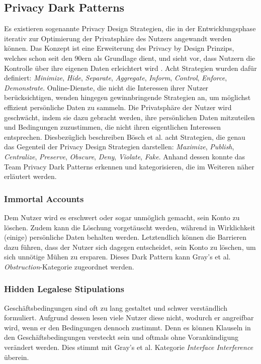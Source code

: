 \documentclass[a4paper]{article}
\begin{document}
\subsection{Privacy Dark Patterns}
\label{sub:privacy_dark_patterns}
Es existieren sogenannte Privacy Design Strategien, die in der Entwicklungsphase iterativ zur Optimierung der Privatsphäre des Nutzers angewandt werden können. Das Konzept ist eine Erweiterung des Privacy by Design Prinzips, welches schon seit den 90ern als Grundlage dient, und sieht vor, dass Nutzern die Kontrolle über ihre eigenen Daten erleichtert wird \cite{boesch}. Acht Strategien wurden dafür definiert: \textit{Minimize}, \textit{Hide}, \textit{Separate}, \textit{Aggregate}, \textit{Inform}, \textit{Control}, \textit{Enforce}, \textit{Demonstrate}.\newline
Online-Dienste, die nicht die Interessen ihrer Nutzer berücksichtigen, wenden hingegen gewinnbringende Strategien an, um möglichst effizient persönliche Daten zu sammeln. Die Privatsphäre der Nutzer wird geschwächt, indem sie dazu gebracht werden, ihre persönlichen Daten mitzuteilen und Bedingungen zuzustimmen, die nicht ihren eigentlichen Interessen entsprechen. Diesbezüglich beschreiben Bösch et al. acht Strategien, die genau das Gegenteil der Privacy Design Strategien darstellen: 
\textit{Maximize}, \textit{Publish}, \textit{Centralize}, \textit{Preserve}, \textit{Obscure}, \textit{Deny}, \textit{Violate}, \textit{Fake}. Anhand dessen konnte das Team Privacy Dark Patterns erkennen und kategorisieren, die im Weiteren näher erläutert werden.

\subsubsection{Immortal Accounts}
\label{sssec:immortal_accounts}
Dem Nutzer wird es erschwert oder sogar unmöglich gemacht, sein Konto zu löschen. Zudem kann die Löschung vorgetäuscht werden, während in Wirklichkeit (einige) persönliche Daten behalten werden. Letztendlich können die Barrieren dazu führen, dass der Nutzer sich dagegen entscheidet, sein Konto zu löschen, um sich unnötige Mühen zu ersparen.\newline
Dieses Dark Pattern kann Gray's et al. \textit{Obstruction}-Kategorie zugeordnet werden.

\subsubsection{Hidden Legalese Stipulations}
\label{sssec:hidden_legalese_stipulations}
Geschäftsbedingungen sind oft zu lang gestaltet und schwer verständlich formuliert. Aufgrund dessen lesen viele Nutzer diese nicht, wodurch er angreifbar wird, wenn er den Bedingungen dennoch zustimmt. Denn es können Klauseln in den Geschäftsbedingungen versteckt sein und oftmals ohne Vorankündigung verändert werden.\newline
Dies stimmt mit Gray's et al. Kategorie \textit{Interface Interference} überein.
\end{document}
